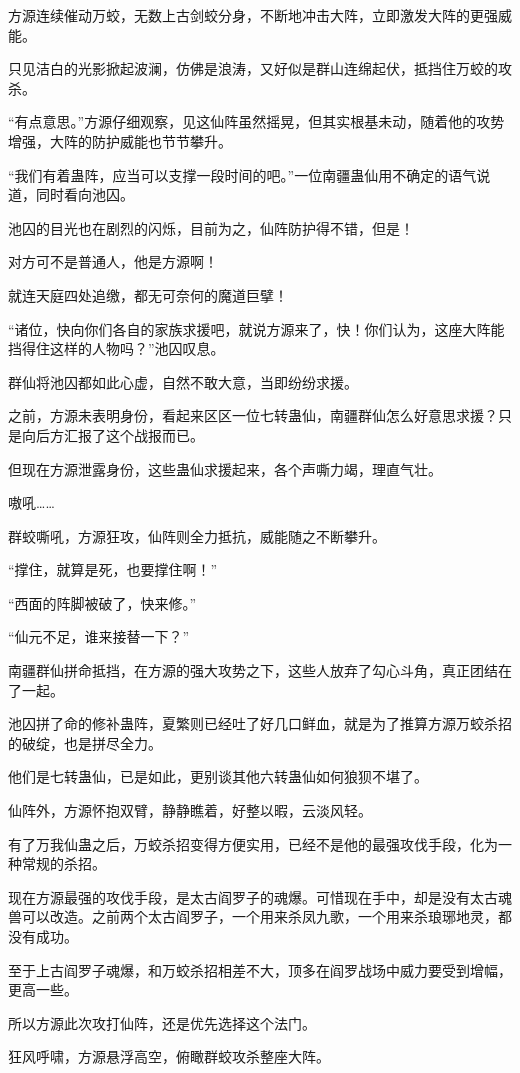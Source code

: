 \begin{this_body}
方源连续催动万蛟，无数上古剑蛟分身，不断地冲击大阵，立即激发大阵的更强威能。

只见洁白的光影掀起波澜，仿佛是浪涛，又好似是群山连绵起伏，抵挡住万蛟的攻杀。

“有点意思。”方源仔细观察，见这仙阵虽然摇晃，但其实根基未动，随着他的攻势增强，大阵的防护威能也节节攀升。

“我们有着蛊阵，应当可以支撑一段时间的吧。”一位南疆蛊仙用不确定的语气说道，同时看向池囚。

池囚的目光也在剧烈的闪烁，目前为之，仙阵防护得不错，但是！

对方可不是普通人，他是方源啊！

就连天庭四处追缴，都无可奈何的魔道巨擘！

“诸位，快向你们各自的家族求援吧，就说方源来了，快！你们认为，这座大阵能挡得住这样的人物吗？”池囚叹息。

群仙将池囚都如此心虚，自然不敢大意，当即纷纷求援。

之前，方源未表明身份，看起来区区一位七转蛊仙，南疆群仙怎么好意思求援？只是向后方汇报了这个战报而已。

但现在方源泄露身份，这些蛊仙求援起来，各个声嘶力竭，理直气壮。

嗷吼……

群蛟嘶吼，方源狂攻，仙阵则全力抵抗，威能随之不断攀升。

“撑住，就算是死，也要撑住啊！”

“西面的阵脚被破了，快来修。”

“仙元不足，谁来接替一下？”

南疆群仙拼命抵挡，在方源的强大攻势之下，这些人放弃了勾心斗角，真正团结在了一起。

池囚拼了命的修补蛊阵，夏繁则已经吐了好几口鲜血，就是为了推算方源万蛟杀招的破绽，也是拼尽全力。

他们是七转蛊仙，已是如此，更别谈其他六转蛊仙如何狼狈不堪了。

仙阵外，方源怀抱双臂，静静瞧着，好整以暇，云淡风轻。

有了万我仙蛊之后，万蛟杀招变得方便实用，已经不是他的最强攻伐手段，化为一种常规的杀招。

现在方源最强的攻伐手段，是太古阎罗子的魂爆。可惜现在手中，却是没有太古魂兽可以改造。之前两个太古阎罗子，一个用来杀凤九歌，一个用来杀琅琊地灵，都没有成功。

至于上古阎罗子魂爆，和万蛟杀招相差不大，顶多在阎罗战场中威力要受到增幅，更高一些。

所以方源此次攻打仙阵，还是优先选择这个法门。

狂风呼啸，方源悬浮高空，俯瞰群蛟攻杀整座大阵。


\end{this_body}
